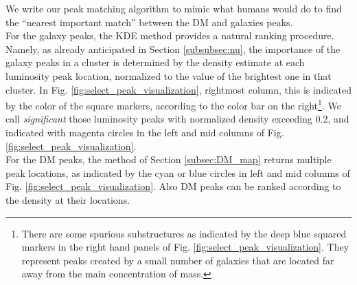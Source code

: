 \documentclass[usenatbib]{mn2e}
\begin{document}
{We write our peak matching algorithm to mimic what humans would do to find the ``nearest important match'' between the DM and galaxies peaks.\\

For the galaxy peaks, the KDE method provides a natural ranking procedure. Namely, as already anticipated in Section \ref{subsubsec:nu}, the importance of the galaxy peaks in a cluster is determined by the density 
estimate at each luminosity peak location, normalized to the value of the brightest one in that cluster. In Fig. \ref{fig:select_peak_visualization}, rightmost column, this is indicated by the color of the square markers, according to the color bar on the right\footnote{There are some spurious substructures as indicated by 
the deep blue squared markers in the right hand panels of Fig. \ref{fig:select_peak_visualization}. They represent peaks created by a small number of galaxies that
are located far away from the main concentration of mass.}. We call {\it significant} those luminosity peaks with normalized density exceeding 0.2, and indicated with magenta circles in the left and mid columns of Fig. \ref{fig:select_peak_visualization}. \\

For the DM peaks, the method of Section \ref{subsec:DM_map} returns multiple peak locations, 
as indicated by the cyan or blue circles in left and mid columns of Fig. \ref{fig:select_peak_visualization}. Also DM peaks can be ranked according to the density at their locations.\\

}
\end{document}
